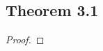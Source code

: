 \documentclass[../../main.tex]{subfiles}
\begin{document}
\subsection{Theorem 3.1}
\begin{wts}
\end{wts}
\begin{proof}
\end{proof}
\end{document}
